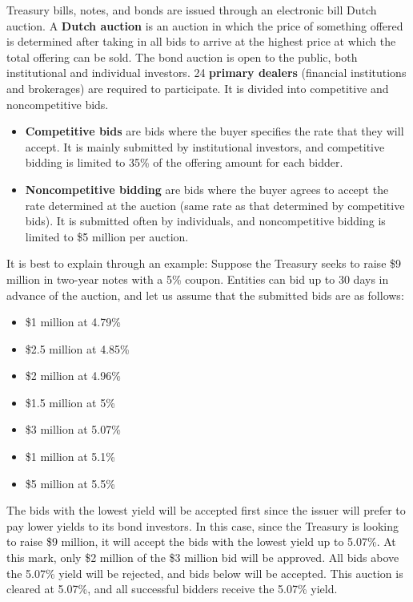 \documentclass{article}
\begin{document}
    Treasury bills, notes, and bonds are issued through an electronic bill Dutch auction. A \textbf{Dutch auction} is an auction in which the price of something offered is determined after taking in all bids to arrive at the highest price at which the total offering can be sold. The bond auction is open to the public, both institutional and individual investors. 24 \textbf{primary dealers} (financial institutions and brokerages) are required to participate. It is divided into competitive and noncompetitive bids.
    \begin{itemize}
        \item \textbf{Competitive bids} are bids where the buyer specifies the rate that they will accept. It is mainly submitted by institutional investors, and competitive bidding is limited to 35\% of the offering amount for each bidder.
        \item \textbf{Noncompetitive bidding} are bids where the buyer agrees to accept the rate determined at the auction (same rate as that determined by competitive bids). It is submitted often by individuals, and noncompetitive bidding is limited to \$5 million per auction.
    \end{itemize}

    \begin{example}
      It is best to explain through an example: Suppose the Treasury seeks to raise \$9 million in two-year notes with a 5\% coupon. Entities can bid up to 30 days in advance of the auction, and let us assume that the submitted bids are as follows:
      \begin{itemize}
          \item \$1 million at 4.79\%
          \item \$2.5 million at 4.85\%
          \item \$2 million at 4.96\%
          \item \$1.5 million at 5\%
          \item \$3 million at 5.07\%
          \item \$1 million at 5.1\%
          \item \$5 million at 5.5\%
      \end{itemize}
      The bids with the lowest yield will be accepted first since the issuer will prefer to pay lower yields to its bond investors. In this case, since the Treasury is looking to raise \$9 million, it will accept the bids with the lowest yield up to 5.07\%. At this mark, only \$2 million of the \$3 million bid will be approved. All bids above the 5.07\% yield will be rejected, and bids below will be accepted. This auction is cleared at 5.07\%, and all successful bidders receive the 5.07\% yield.
    \end{example}
\end{document}
